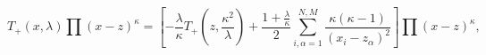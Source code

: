 \begin{equation}	
	 T_{+}(x,\lambda)\prod(x-z)^{\kappa}=
	\left[
	-\frac{\lambda}{\kappa}T_{+}(z,\frac{\kappa^{2}}{\lambda})+
	\frac{1+\frac{\lambda}{\kappa}}{2}\sum_{i,\alpha=1}^{N,M}
	\frac{\kappa(\kappa-1)}{(x_{i}-z_{\alpha})^{2}}
	\right]
	\prod(x-z)^{\kappa} ,
\end{equation}

